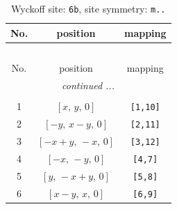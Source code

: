 \documentclass[fleqn,8pt]{jsarticle}
\begin{document}
\begin{longtable}{ccc}
\caption{Wyckoff site: {\tt 6b}, site symmetry: {\tt m..}}
 \\
 \hline \hline
No. & position & mapping \\ \hline \endfirsthead

\multicolumn{2}{l}{\tablename\ \thetable{}} \\
 \hline \hline
No. & position & mapping \\ \hline \endhead

 \hline \hline
\multicolumn{2}{r}{\footnotesize\it continued ...} \\ \endfoot

 \hline \hline
\multicolumn{2}{r}{} \\ \endlastfoot

1 & $\left[ x,\, y,\, 0 \right]$ & {\tt [1,10]} \\ \hline
2 & $\left[ - y,\, x - y,\, 0 \right]$ & {\tt [2,11]} \\ \hline
3 & $\left[ - x + y,\, - x,\, 0 \right]$ & {\tt [3,12]} \\ \hline
4 & $\left[ - x,\, - y,\, 0 \right]$ & {\tt [4,7]} \\ \hline
5 & $\left[ y,\, - x + y,\, 0 \right]$ & {\tt [5,8]} \\ \hline
6 & $\left[ x - y,\, x,\, 0 \right]$ & {\tt [6,9]} \\
\end{longtable}
\renewcommand{\arraystretch}{1.2}
\end{document}

